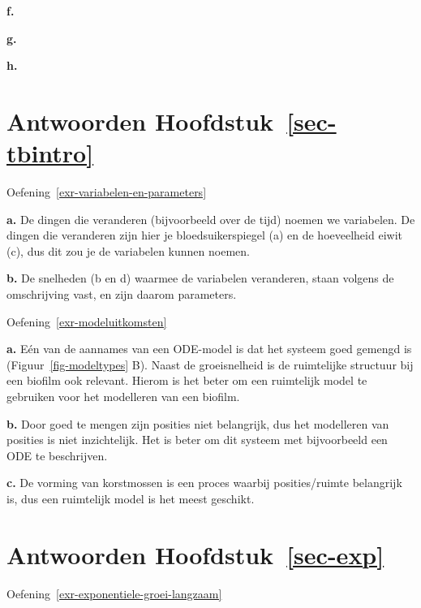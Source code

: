 \documentclass[
  a4paper,
]{scrbook}
\theoremstyle{definition}
\theoremstyle{remark}
\begin{document}
\textbf{f.}

\textbf{g.}

\textbf{h.}

\hypertarget{antwoorden-sec-tbintro}{%
\section*{\texorpdfstring{Antwoorden
Hoofdstuk~\ref{sec-tbintro}}{Antwoorden Hoofdstuk~}}\label{antwoorden-sec-tbintro}}


Oefening~\ref{exr-variabelen-en-parameters}

\textbf{a.} De dingen die veranderen (bijvoorbeeld over de tijd) noemen
we variabelen. De dingen die veranderen zijn hier je bloedsuikerspiegel
(a) en de hoeveelheid eiwit (c), dus dit zou je de variabelen kunnen
noemen.

\textbf{b.} De snelheden (b en d) waarmee de variabelen veranderen,
staan volgens de omschrijving vast, en zijn daarom parameters.

Oefening~\ref{exr-modeluitkomsten}

\textbf{a.} Eén van de aannames van een ODE-model is dat het systeem
goed gemengd is (Figuur~\ref{fig-modeltypes} B). Naast de groeisnelheid
is de ruimtelijke structuur bij een biofilm ook relevant. Hierom is het
beter om een ruimtelijk model te gebruiken voor het modelleren van een
biofilm.

\textbf{b.} Door goed te mengen zijn posities niet belangrijk, dus het
modelleren van posities is niet inzichtelijk. Het is beter om dit
systeem met bijvoorbeeld een ODE te beschrijven.

\textbf{c.} De vorming van korstmossen is een proces waarbij
posities/ruimte belangrijk is, dus een ruimtelijk model is het meest
geschikt.

\hypertarget{antwoorden-sec-exp}{%
\section*{\texorpdfstring{Antwoorden
Hoofdstuk~\ref{sec-exp}}{Antwoorden Hoofdstuk~}}\label{antwoorden-sec-exp}}


Oefening~\ref{exr-exponentiele-groei-langzaam}
\end{document}
